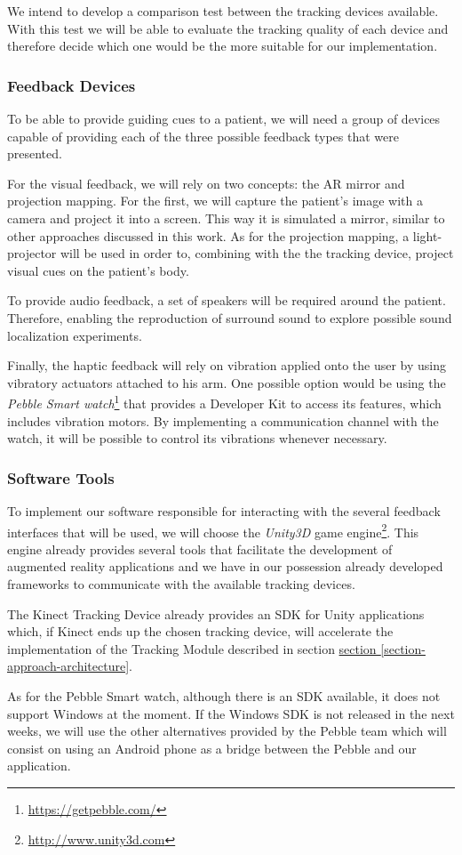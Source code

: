 We intend to develop a comparison test between the tracking devices available. With this test we will be able to evaluate the tracking quality of each device and therefore decide which one would be the more suitable for our implementation. 

\subsubsection{Feedback Devices}

To be able to provide guiding cues to a patient, we will need a group of devices capable of providing each of the three possible feedback types that were presented.

For the visual feedback, we will rely on two concepts: the \ac{AR} mirror and projection mapping. 
For the first, we will capture the patient's image with a camera and project it into a screen. 
This way it is simulated a mirror, similar to other approaches discussed in this work.
As for the projection mapping, a light-projector will be used in order to, combining with 
the the tracking device, project visual cues on the patient's body.

To provide audio feedback, a set of speakers will be required around the patient. 
Therefore, enabling the reproduction of surround sound to explore possible sound localization experiments.

Finally, the haptic feedback will rely on vibration applied onto the user by using 
vibratory actuators attached to his arm. 
One possible option would be using the \textit{Pebble Smart watch}\footnote{\url{https://getpebble.com/}} that 
provides a Developer Kit to access its features, which includes vibration motors. 
By implementing a communication channel with the watch, it will be possible to control its vibrations whenever necessary.

\subsubsection{Software Tools}

To implement our software responsible for interacting with the several feedback interfaces that 
will be used, we will choose the \emph{Unity3D} game engine\footnote{\url{http://www.unity3d.com}}. 
This engine already provides several tools that facilitate the development of augmented reality applications and we have in our possession already developed frameworks to communicate with the available tracking devices.

The Kinect Tracking Device already provides an SDK for Unity applications which, if Kinect ends up the chosen tracking device, will accelerate the implementation of the Tracking Module described in section \hyperref[section-approach-architecture]{section \ref{section-approach-architecture}}.

As for the Pebble Smart watch, although there is an SDK available, it does not support Windows at the moment. If the Windows SDK is not released in the next weeks, we will use the other alternatives provided by the Pebble team which will consist on using an Android phone as a bridge between the Pebble and our application.
